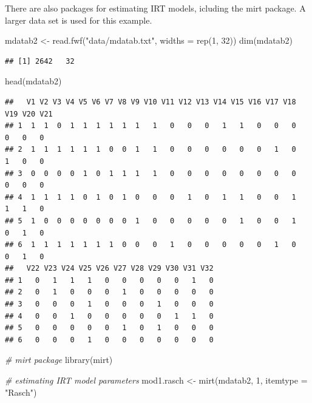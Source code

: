 \documentclass[
]{book}
\newenvironment{Shaded}{\begin{snugshade}}{\end{snugshade}}
\newcommand{\AttributeTok}[1]{\textcolor[rgb]{0.77,0.63,0.00}{#1}}
\newcommand{\CommentTok}[1]{\textcolor[rgb]{0.56,0.35,0.01}{\textit{#1}}}
\newcommand{\DecValTok}[1]{\textcolor[rgb]{0.00,0.00,0.81}{#1}}
\newcommand{\FunctionTok}[1]{\textcolor[rgb]{0.00,0.00,0.00}{#1}}
\newcommand{\NormalTok}[1]{#1}
\newcommand{\OtherTok}[1]{\textcolor[rgb]{0.56,0.35,0.01}{#1}}
\newcommand{\StringTok}[1]{\textcolor[rgb]{0.31,0.60,0.02}{#1}}
\begin{document}
There are also packages for estimating IRT models, icluding the mirt package. A larger data set is used for this example.

\begin{Shaded}
\begin{Highlighting}[]
\NormalTok{mdatab2 }\OtherTok{\textless{}{-}} \FunctionTok{read.fwf}\NormalTok{(}\StringTok{"data/mdatab.txt"}\NormalTok{, }\AttributeTok{widths =} \FunctionTok{rep}\NormalTok{(}\DecValTok{1}\NormalTok{, }\DecValTok{32}\NormalTok{))}
\FunctionTok{dim}\NormalTok{(mdatab2)}
\end{Highlighting}
\end{Shaded}

\begin{verbatim}
## [1] 2642   32
\end{verbatim}

\begin{Shaded}
\begin{Highlighting}[]
\FunctionTok{head}\NormalTok{(mdatab2)}
\end{Highlighting}
\end{Shaded}

\begin{verbatim}
##   V1 V2 V3 V4 V5 V6 V7 V8 V9 V10 V11 V12 V13 V14 V15 V16 V17 V18 V19 V20 V21
## 1  1  1  0  1  1  1  1  1  1   1   0   0   0   1   1   0   0   0   0   0   0
## 2  1  1  1  1  1  1  0  0  1   1   0   0   0   0   0   0   1   0   1   0   0
## 3  0  0  0  0  1  0  1  1  1   1   0   0   0   0   0   0   0   0   0   0   0
## 4  1  1  1  1  0  1  0  1  0   0   0   1   0   1   1   0   0   1   1   1   0
## 5  1  0  0  0  0  0  0  0  1   0   0   0   0   0   1   0   0   1   0   1   0
## 6  1  1  1  1  1  1  1  0  0   0   1   0   0   0   0   0   1   0   0   1   0
##   V22 V23 V24 V25 V26 V27 V28 V29 V30 V31 V32
## 1   0   1   1   1   0   0   0   0   0   1   0
## 2   0   1   0   0   0   1   0   0   0   0   0
## 3   0   0   0   1   0   0   0   1   0   0   0
## 4   0   0   1   0   0   0   0   0   1   1   0
## 5   0   0   0   0   0   1   0   1   0   0   0
## 6   0   0   0   1   0   0   0   0   0   0   0
\end{verbatim}

\begin{Shaded}
\begin{Highlighting}[]
\CommentTok{\# mirt package}
\FunctionTok{library}\NormalTok{(mirt)}

\CommentTok{\# estimating IRT model parameters}
\NormalTok{mod1.rasch }\OtherTok{\textless{}{-}} \FunctionTok{mirt}\NormalTok{(mdatab2, }\DecValTok{1}\NormalTok{, }\AttributeTok{itemtype =} \StringTok{"Rasch"}\NormalTok{)}
\end{Highlighting}
\end{Shaded}
\end{document}
